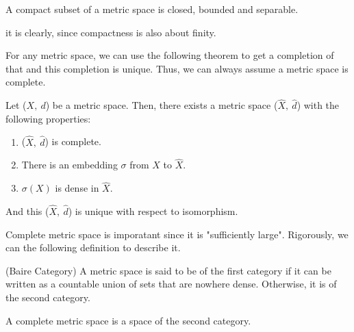 \documentclass[a4paper,11pt]{report}
\begin{document}
\begin{prop}
	A compact subset of a metric space is closed, bounded and separable.
\end{prop}
\begin{rem}
	it is clearly, since compactness is also about finity.
\end{rem}

For any metric space, we can use the following theorem to get a completion of that and this completion is unique. Thus, we can always assume a metric space is complete.
\begin{thm}
	Let ($X,~ d$) be a metric space. Then, there exists a metric space ($\hat{X},~ \hat{d}$) with the following properties:
	\begin{enumerate}[label=\arabic*)]
		\item ($\hat{X},~ \hat{d}$) is complete.
		\item There is an embedding $\sigma$ from $X$ to $\hat{X}$.
		\item $\sigma(X)$ is dense in $\hat{X}$.
	\end{enumerate}
	And this ($\hat{X},~ \hat{d}$) is unique with respect to isomorphism.
\end{thm}

Complete metric space is imporatant since it is "sufficiently large". Rigorously, we can the following definition to describe it.

\begin{defn}
	(Baire Category)
	A metric space is said to be of the first category if it can be written as a countable union of sets that are nowhere dense. Otherwise, it is of the second category.
\end{defn}

\begin{prop}
	A complete metric space is a space of the second category.
\end{prop}
\end{document}
